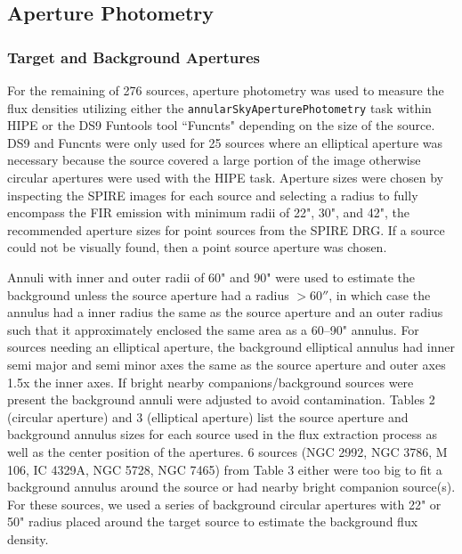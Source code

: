 \subsection{Aperture Photometry}\label{aperture}
\subsubsection{Target and Background Apertures}
For the remaining of 276 sources, aperture photometry was used to measure the flux densities utilizing either the \texttt{annularSkyAperturePhotometry} task within HIPE or the DS9 Funtools tool ``Funcnts" depending on the size of the source. DS9 and Funcnts were only used for 25 sources where an elliptical aperture was necessary because the source covered a large portion of the image otherwise circular apertures were used with the HIPE task. Aperture sizes were chosen by inspecting the SPIRE images for each source and selecting a radius to fully encompass the FIR emission with minimum radii of 22", 30", and 42", the recommended aperture sizes for point sources from the SPIRE DRG. If a source could not be visually found, then a point source aperture was chosen. 

Annuli with inner and outer radii of 60" and 90" were used to estimate the background unless the source aperture had a radius $>60''$, in which case the annulus had a inner radius the same as the source aperture and an outer radius such that it approximately enclosed the same area as a 60--90" annulus. For sources needing an elliptical aperture, the background elliptical annulus had inner semi major and semi minor axes the same as the source aperture and outer axes 1.5x the inner axes. If bright nearby companions/background sources were present the background annuli were adjusted to avoid contamination. Tables 2 (circular aperture) and 3 (elliptical aperture) list the source aperture and background annulus sizes for each source used in the flux extraction process as well as the center position of the apertures. 6 sources (NGC 2992, NGC 3786, M 106, IC 4329A, NGC 5728, NGC 7465) from Table 3 either were too big to fit a background annulus around the source or had nearby bright companion source(s). For these sources, we used a series of background circular apertures with 22" or 50" radius placed around the target source to estimate the background flux density.

